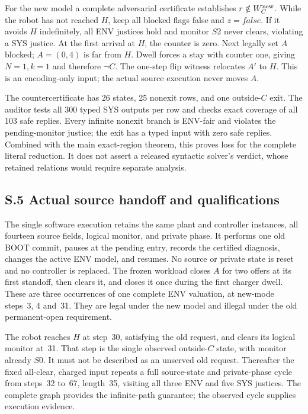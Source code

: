 For the new model a complete adversarial certificate establishes
$r\notin W_C^{\rm new}$. While the robot has not reached $H$, keep all
blocked flags false and $z=false$. If it avoids $H$ indefinitely,
all ENV justices hold and monitor $S2$ never clears, violating a SYS
justice. At the first arrival at $H$, the counter is zero. Next legally
set $A$ blocked; $A=(0,4)$ is far from $H$. Dwell forces a stay with
counter one, giving $N=1,k=1$ and therefore $\neg C$.
The one-step flip witness relocates $A'$ to $H$. This is an encoding-only
input; the actual source execution never moves $A$.

The countercertificate has 26 states, 25 nonexit rows, and one
outside-$C$ exit. The auditor tests all 300 typed SYS outputs per row and
checks exact coverage of all 103 safe replies. Every infinite nonexit
branch is ENV-fair and violates the pending-monitor justice; the exit
has a typed input with zero safe replies. Combined with the main exact-region
theorem, this proves loss for the complete literal reduction. It does
not assert a released syntactic solver's verdict, whose retained relations
would require separate analysis.

\subsection*{S.5 Actual source handoff and qualifications}
The single software execution retains the same plant and controller
instances, all fourteen source fields, logical monitor, and private phase.
It performs one old BOOT commit, pauses at the pending entry, records the
certified diagnosis, changes the active ENV model, and resumes. No source
or private state is reset and no controller is replaced.
The frozen workload closes $A$ for two offers at its first standoff,
then clears it, and closes it once during the first charger dwell.
These are three occurrences of one complete ENV valuation, at new-mode
steps~3, 4 and~31. They are legal under the new model and illegal under
the old permanent-open requirement.

The robot reaches $H$ at step~30, satisfying the old request, and clears
its logical monitor at~31. That step is the single observed outside-$C$
state, with monitor already $S0$. It must not be described as an unserved
old request. Thereafter the fixed all-clear, charged input repeats a
full source-state and private-phase cycle from steps~32 to~67, length~35,
visiting all three ENV and five SYS justices. The complete graph provides
the infinite-path guarantee; the observed cycle supplies execution evidence.

